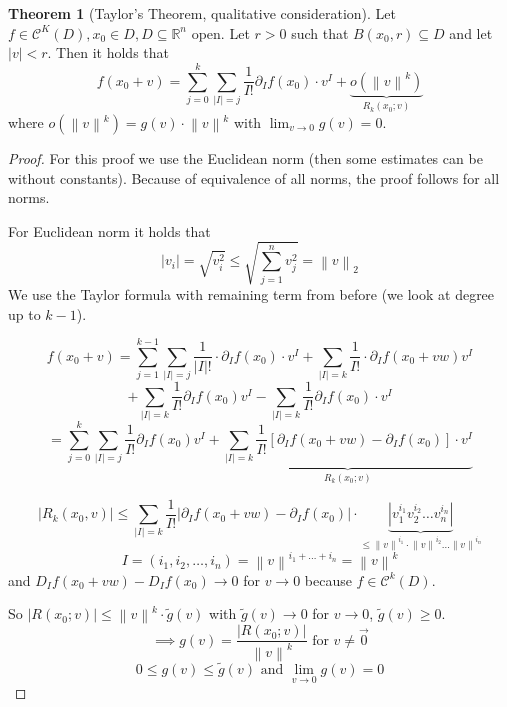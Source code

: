 \documentclass[a4paper,landscape,twocolumn]{article}
\theoremstyle{definition}
\newtheorem{theorem}{Theorem}
\newcommand\abs[1]{\left|#1\right|}
\newcommand\norm[1]{\left\|#1\right\|}
\begin{document}
\begin{theorem}[Taylor's Theorem, qualitative consideration]
  Let $f \in \mathcal{C}^K(D), x_0 \in D, D \subseteq \mathbb R^n$ open.
  Let $r>0$ such that $B(x_0, r) \subseteq D$ and let $\abs{v} < r$.
  Then it holds that
  \[ f(x_0 + v) = \sum_{j=0}^k \sum_{\abs{I} = j} \frac1{I!} \partial_I f(x_0) \cdot v^I + \underbrace{o(\norm{v}^k)}_{R_k(x_0;v)} \]
  where $o(\norm{v}^k) = g(v) \cdot \norm{v}^k$ with $\lim_{v\to0} g(v) = 0$.
\end{theorem}
\begin{proof}
  For this proof we use the Euclidean norm (then some estimates can be without constants).
  Because of equivalence of all norms, the proof follows for all norms.

  For Euclidean norm it holds that
  \[ \abs{v_i} = \sqrt{v_i^2} \leq \sqrt{\sum_{j=1}^n v_j^2} = \norm{v}_2 \]
  We use the Taylor formula with remaining term from before
  (we look at degree up to $k-1$).

  \[ f(x_0 + v) = \sum_{j=1}^{k-1} \sum_{\abs{I}=j} \frac{1}{\abs{I}!} \cdot \partial_I f(x_0) \cdot v^I + \sum_{\abs{I}=k} \frac{1}{I!} \cdot \partial_I f(x_0 + vw) v^I \]
  \[ + \sum_{\abs{I}=k} \frac{1}{I!} \partial_I f(x_0) v^I - \sum_{\abs{I}=k} \frac{1}{I!} \partial_I f(x_0) \cdot v^I \]
  \[ = \sum_{j=0}^k \sum_{\abs{I}=j} \frac{1}{I!} \partial_I f(x_0) v^I + \underbrace{\sum_{\abs{I}=k} \frac{1}{I!} \left[\partial_I f(x_0 + vw) - \partial_I f(x_0)\right] \cdot v^I}_{R_k(x_0;v)} \]

  \[ \abs{R_k(x_0, v)} \leq \sum_{\abs{I}=k} \frac{1}{I!} \abs{\partial_I f(x_0 + vw) - \partial_I f(x_0)} \cdot \underbrace{\abs{v_1^{i_1} v_2^{i_2} \ldots v_n^{i_n}}}_{\leq \norm{v}^{i_1} \cdot \norm{v}^{i_2} \ldots \norm{v}^{i_n}} \]
  \[ I = (i_1, i_2, \ldots, i_n) = \norm{v}^{i_1+\ldots+i_n} = \norm{v}^k \]
  and $D_I f(x_0 + vw) - D_I f(x_0) \to 0$ for $v\to 0$ because $f \in \mathcal{C}^k(D)$.

  So $\abs{R(x_0;v)} \leq \norm{v}^k \cdot \tilde{g}(v)$ with $\tilde{g}(v) \to 0$ for $v \to 0$, $\tilde{g}(v) \geq 0$.
  \[ \implies g(v) = \frac{\abs{R(x_0;v)}}{\norm{v}^k} \text{ for } v \neq \vec{0} \]
  \[ 0 \leq g(v) \leq \tilde{g}(v) \text{ and } \lim_{v\to0} g(v) = 0 \]
\end{proof}
\end{document}
